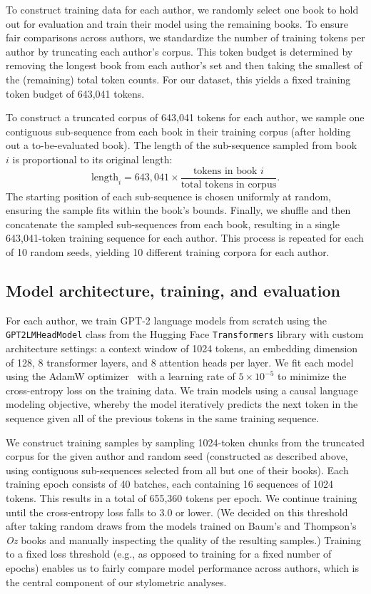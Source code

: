 \documentclass{llmxive}
\begin{document}
To construct training data for each author, we randomly select one book to hold
out for evaluation and train their model using the remaining books. To ensure
fair comparisons across authors, we standardize the number of training tokens
per author by truncating each author's corpus. This token budget is determined
by removing the longest book from each author's set and then taking the
smallest of the (remaining) total token counts. For our dataset, this yields a
fixed training token budget of 643,041 tokens.

To construct a truncated corpus of 643,041 tokens for each author, we sample
one contiguous sub-sequence from each book in their training corpus (after
holding out a to-be-evaluated book). The length of the sub-sequence sampled
from book~$i$ is proportional to its original length:
\[
\text{length}_i = 643{,}041 \times \frac{\text{tokens in book
  }i}{\text{total tokens in corpus}}.
\]
The starting position of each sub-sequence is chosen uniformly at random,
ensuring the sample fits within the book's bounds. Finally, we shuffle and then
concatenate the sampled sub-sequences from each book, resulting in a single
643,041-token training sequence for each author. This process is repeated for
each of 10 random seeds, yielding 10 different training corpora for each
author.

\subsection{Model architecture, training, and evaluation}

For each author, we train GPT-2 language models from scratch using the
\texttt{GPT2LMHeadModel} class from the Hugging Face \texttt{Transformers}
library with custom architecture settings: a context window of 1024 tokens, an
embedding dimension of 128, 8 transformer layers, and 8 attention heads per
layer. We fit each model using the AdamW optimizer~\citep{LoshHutt17} with a
learning rate of $5 \times 10^{-5}$ to minimize the cross-entropy loss on the
training data. We train models using a causal language modeling objective,
whereby the model iteratively predicts the next token in the sequence given all
of the previous tokens in the same training sequence.

We construct training samples by sampling 1024-token chunks from the truncated
corpus for the given author and random seed (constructed as described above,
using contiguous sub-sequences selected from all but one of their books). Each
training epoch consists of 40 batches, each containing 16 sequences of 1024
tokens. This results in a total of 655,360 tokens per epoch. We continue
training until the cross-entropy loss falls to 3.0 or lower. (We decided on
this threshold after taking random draws from the models trained on Baum's and
Thompson's \textit{Oz} books and manually inspecting the quality of the
resulting samples.) Training to a fixed loss threshold (e.g., as opposed to
training for a fixed number of epochs) enables us to fairly compare model
performance across authors, which is the central component of our stylometric
analyses.
\end{document}
